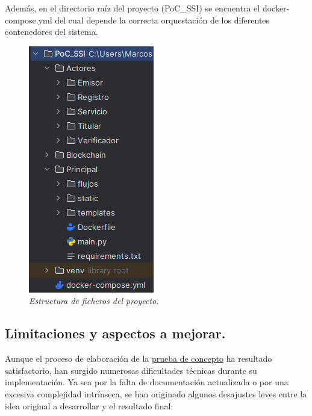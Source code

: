 \documentclass[../main.tex]{subfiles}
\begin{document}
\noindent Además, en el directorio raíz del proyecto (PoC\_SSI) se encuentra el docker-compose.yml del cual depende la correcta orquestación de los diferentes contenedores del sistema.
\\

\begin{figure}[htbp]
    \centering
    \includegraphics[width=0.3\linewidth]{images/design/proyecto.png}
    \caption{\textit{Estructura de ficheros del proyecto.}}
\end{figure}


\newpage
\subsection{Limitaciones y aspectos a mejorar.}\label{Limitaciones y aspectos a mejorar}
Aunque el proceso de elaboración de la \hyperref[Prueba de concepto]{prueba de concepto} ha resultado satisfactorio, han surgido numerosas dificultades técnicas durante su implementación. Ya sea por la falta de documentación actualizada o por una excesiva complejidad intrínseca, se han originado algunos desajustes leves entre la idea original a desarrollar y el resultado final:
\end{document}
